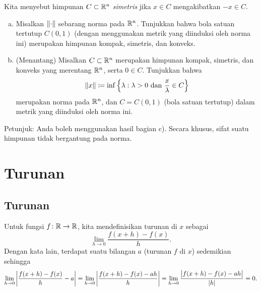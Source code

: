 \begin{exercise}
Kita menyebut himpunan $C \subset {\mathbb{R}}^n$ \emph{simetris} jika
$x \in C$ mengakibatkan $-x \in C$.
\begin{enumerate}[a)]
\item
Misalkan $\lVert {\cdot} \rVert$ sebarang norma pada ${\mathbb{R}}^n$.  Tunjukkan bahwa bola satuan tertutup
$C(0,1)$ (dengan menggunakan metrik yang diinduksi oleh norma ini)
merupakan himpunan kompak, simetris, dan konveks.
\item (Menantang)
Misalkan $C \subset {\mathbb{R}}^n$ merupakan himpunan kompak,
simetris, dan konveks yang merentang ${\mathbb{R}}^n$, serta $0 \in C$.  Tunjukkan bahwa
\begin{equation*}
\lVert {x} \rVert \coloneqq \inf \left\{ \lambda : \lambda > 0 \text{ dan } \frac{x}{\lambda} \in C \right\}
\end{equation*}
merupakan norma pada ${\mathbb{R}}^n$, dan $C = C(0,1)$ (bola satuan tertutup) dalam metrik yang diinduksi oleh norma ini.
\end{enumerate}
Petunjuk: Anda boleh menggunakan hasil 
bagian c).  Secara khusus, sifat  suatu himpunan tidak bergantung pada
norma.
\end{exercise}


\sectionnewpage
\section{Turunan}
\label{sec:svtheder}



\subsection{Turunan}

Untuk fungsi $f \colon {\mathbb{R}} \to {\mathbb{R}}$, kita mendefinisikan
turunan di $x$ sebagai
\begin{equation*}
\lim_{h \to 0} \frac{f(x+h)-f(x)}{h} .
\end{equation*}
Dengan kata lain, terdapat suatu bilangan $a$ (turunan $f$ di $x$) sedemikian sehingga
\begin{equation*}
\lim_{h \to 0} \left\lvert {\frac{f(x+h)-f(x)}{h} - a} \right\rvert
=
\lim_{h \to 0} \left\lvert {\frac{f(x+h)-f(x) - ah}{h}} \right\rvert
=
\lim_{h \to 0} \frac{\bigl\lvert {f(x+h)-f(x) - ah} \bigr\rvert}{\lvert {h} \rvert}
= 0.
\end{equation*}


